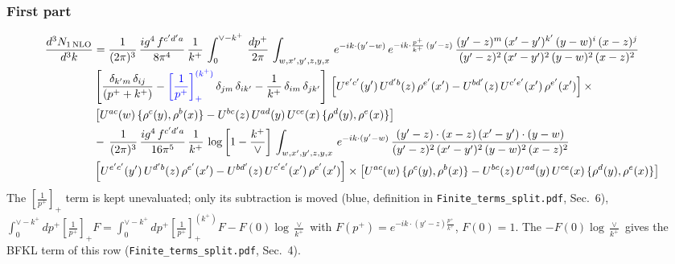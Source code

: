 \documentclass[9pt]{article}
\newcommand{\new}[1]{{\color{blue}#1}}
\numberwithin{equation}{section}
\begin{document}
 \subsubsection{First part}
 \begin{align}
     \frac{d^{3}N_{1\,\rm NLO}}{d^{3}k} & = \frac{1}{(2\pi)^{3}}\, \frac{ig^{4}\,f^{c'd'a}}{8\pi^{4}}\, \frac{1}{k^{+}}\,\int_{0}^{\vee-k^{+}}\,  \frac{dp^{+}}{2\pi}\, \int_{w,x',y',z,y,x}\, e^{-ik\cdot (y'-w)}\, e^{-ik\cdot \frac{p^{+}}{k^{+}}\,(y'-z)}\,\frac{(y'-z)^{m}\,(x'-y')^{k'}\,(y-w)^{i}\,(x-z)^{j}}{(y'-z)^{2}\,(x'-y')^{2}\,(y-w)^{2}\,(x-z)^{2}}\notag \\ & \left[\frac{\delta_{k'm}\,\delta_{ij}}{(p^{+}+k^{+})}-\new{\left[\frac{1}{p^{+}}\right]_{+}^{(k^{+})}}\,\delta_{jm}\,\delta_{ik'}-\frac{1}{k^{+}}\, \delta_{im}\, \delta_{jk'}\right]\, \left[U^{e'c'}(y')\,U^{d'b}(z)\,\rho^{e'}(x')-U^{bd'}(z)\,U^{c'e'}(x')\,\rho^{e'}(x')\right]\times\notag \\ &  \left[U^{ac}(w)\, \{\rho^{c}(y),\rho^{b}(x)\}-U^{bc}(z)\,U^{ad}(y)\,U^{ce}(x)\,\{\rho^{d}(y),\rho^{e}(x)\}\right]\notag \\ & -\,\frac{1}{(2\pi)^{3}}\, \frac{ig^{4}\,f^{c'd'a}}{16\pi^{5}}\, \frac{1}{k^{+}}\, \log{\left[1-\frac{k^{+}}{\vee}\right]}\, \int_{w,x',y',z,y,x}\, e^{-ik\cdot (y'-w)}\,\frac{(y'-z)\cdot (x-z)\,(x'-y')\cdot (y-w)}{(y'-z)^{2}\,(x'-y')^{2}\,(y-w)^{2}\,(x-z)^{2}}\notag \\ &  \left[U^{e'c'}(y')\,U^{d'b}(z)\,\rho^{e'}(x')-U^{bd'}(z)\,U^{c'e'}(x')\,\rho^{e'}(x')\right]\times  \left[U^{ac}(w)\, \{\rho^{c}(y),\rho^{b}(x)\}-U^{bc}(z)\,U^{ad}(y)\,U^{ce}(x)\,\{\rho^{d}(y),\rho^{e}(x)\}\right]
\end{align}
\new{The $\left[\frac{1}{p^+}\right]_+$ term is kept unevaluated; only its subtraction is moved (blue, definition in \texttt{Finite\_terms\_split.pdf}, Sec.~6), $\int_0^{\vee-k^+}dp^+\left[\frac{1}{p^+}\right]_+F=\int_0^{\vee-k^+}dp^+\left[\frac{1}{p^+}\right]_+^{(k^+)}F-F(0)\log\frac{\vee}{k^+}$ with $F(p^+)=e^{-ik\cdot(y'-z)\frac{p^+}{k^+}}$, $F(0)=1$. The $-F(0)\log\frac{\vee}{k^+}$ gives the BFKL term of this row (\texttt{Finite\_terms\_split.pdf}, Sec.~4).}
 
\end{document}
